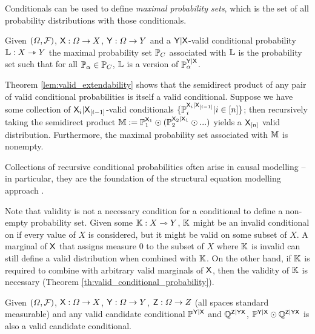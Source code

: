 Conditionals can be used to define \emph{maximal probability sets}, which is the set of all probability distributions with those conditionals.

\begin{definition}
Given $(\Omega,\mathcal{F})$, $\mathsf{X}:\Omega\to X$, $\mathsf{Y}:\Omega\to Y$ and a $\mathsf{Y}|\mathsf{X}$-valid conditional probability $\mathbb{L}:X\rightarrowtriangle Y$ the maximal probability set $\mathbb{P}_C$ associated with $\mathbb{L}$ is the probability set such that for all $\mathbb{P}_\alpha\in \mathbb{P}_C$, $\mathbb{L}$ is a version of $\mathbb{P}_\alpha^{\mathsf{Y}|\mathsf{X}}$.
\end{definition}

Theorem \ref{lem:valid_extendability} shows that the semidirect product of any pair of valid conditional probabilities is itself a valid conditional. Suppose we have some collection of $\mathsf{X}_i|\mathsf{X}_{[i-1]}$-valid conditionals $\{\mathbb{P}_i^{\mathsf{X}_i|\mathsf{X}_{[i-1]}}|i\in [n]\}$; then recursively taking the semidirect product $\mathbb{M}:=\mathbb{P}_1^{\mathsf{X}_1}\odot (\mathbb{P}_2^{\mathsf{X}_2|\mathsf{X}_{1}}\odot ...)$ yields a $\mathsf{X}_{[n]}$ valid distribution. Furthermore, the maximal probability set associated with $\mathbb{M}$ is nonempty.

Collections of recursive conditional probabilities often arise in causal modelling -- in particular, they are the foundation of the structural equation modelling approach \citet{richardson2013single,pearl_causality:_2009}.

Note that validity is not a necessary condition for a conditional to define a non-empty probability set. Given some $\mathbb{K}:X\rightarrowtriangle Y$, $\mathbb{K}$ might be an invalid conditional on if every value of $X$ is considered, but it might be valid on some subset of $X$. A marginal of $\mathsf{X}$ that assigns measure 0 to the subset of $X$ where $\mathbb{K}$ is invalid can still define a valid distribution when combined with $\mathbb{K}$. On the other hand, if $\mathbb{K}$ is required to combine with arbitrary valid marginals of $\mathsf{X}$, then the validity of $\mathbb{K}$ is necessary (Theorem \ref{th:valid_conditional_probability}).

\begin{theorem}\label{lem:valid_extendability}
Given $(\Omega,\mathcal{F})$, $\mathsf{X}:\Omega\to X$, $\mathsf{Y}:\Omega\to Y$, $\mathsf{Z}:\Omega\to Z$ (all spaces standard measurable) and any valid candidate conditional $\mathbb{P}^{\mathsf{Y}|\mathsf{X}}$ and $\mathbb{Q}^{\mathsf{Z}|\mathsf{Y}\mathsf{X}}$, $ \mathbb{P}^{\mathsf{Y}|\mathsf{X}}\odot \mathbb{Q}^{\mathsf{Z}|\mathsf{Y}\mathsf{X}}$ is also a valid candidate conditional.
\end{theorem}


